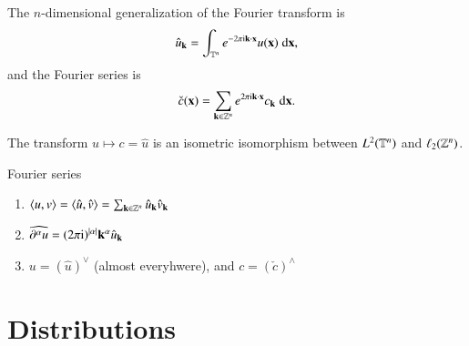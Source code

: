 The $n$-dimensional generalization of the Fourier transform is
\begin{equation}
    \hat{u}_{\mathbf{k}} = \int_{\mathbb{T}^n} e^{-2\pi \mathrm{i} \mathbf{k}\cdot\mathbf{x}} u(\mathbf{x}) \; \mathrm{d} \mathbf{x},
\end{equation}
and the Fourier series is
\begin{equation}
    \check{c}(\mathbf{x}) = \sum_{\mathbf{k}\in \mathbb{Z}^n} e^{2\pi 
    \mathrm{i} \mathbf{k}\cdot\mathbf{x}} c_{\mathbf{k}} \; \mathrm{d} \mathbf{x}.
\end{equation}

The transform $u \mapsto c = \hat{u}$ is an isometric isomorphism between $L^2(\mathbb{T}^n)$ and $\ell_2(\mathbb{Z}^n)$.

\begin{myTheorem}{Fourier series}{}
\begin{enumerate}
    \item $\braket{u,v} = \braket{\hat{u},\hat{v}} = \sum_{\mathbf{k}\in\mathbb{Z}^n} \hat{u}_{\mathbf{k}}\hat{v}_{\mathbf{k}}$ 
    \item $\widehat{\partial^\alpha u} = (2\pi \mathrm{i})^{|\alpha|} \mathbf{k}^\alpha \hat{u}_{\mathbf{k}}$ 
    \item $u = (\hat{u})^\vee$ (almost everyhwere), and $c = (\check{c})^\wedge$  
\end{enumerate}
\end{myTheorem}




\section{Distributions}

